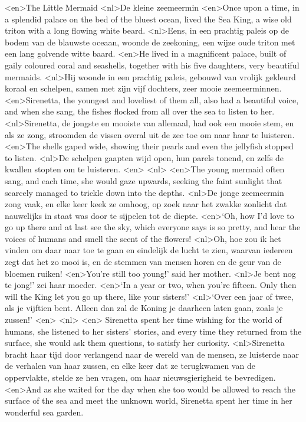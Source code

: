 <en>The Little Mermaid
<nl>De kleine zeemeermin
<en>Once upon a time, in a splendid palace on the bed of the bluest ocean, lived the Sea King, a wise old triton with a long flowing white beard.
<nl>Eens, in een prachtig paleis op de bodem van de blauwste oceaan, woonde de zeekoning, een wijze oude triton met een lang golvende witte baard.
<en>He lived in a magnificent palace, built of gaily coloured coral and seashells, together with his five daughters, very beautiful mermaids.
<nl>Hij woonde in een prachtig paleis, gebouwd van vrolijk gekleurd koraal en schelpen, samen met zijn vijf dochters, zeer mooie zeemeerminnen.
<en>Sirenetta, the youngest and loveliest of them all, also had a beautiful voice, and when she sang, the fishes flocked from all over the sea to listen to her.
<nl>Sirenetta, de jongste en mooiste van allemaal, had ook een mooie stem, en als ze zong, stroomden de vissen overal uit de zee toe om naar haar te luisteren.
<en>The shells gaped wide, showing their pearls and even the jellyfish stopped to listen.
<nl>De schelpen gaapten  wijd open,  hun parels  tonend, en zelfs de kwallen stopten om te luisteren.
<en>
<nl>
<en>The young mermaid often sang, and each time, she would gaze upwards, seeking the faint sunlight that scarcely managed to trickle down into the depths.
<nl>De jonge zeemeermin zong vaak, en elke keer keek ze omhoog, op zoek naar het zwakke zonlicht dat nauwelijks in staat was door te sijpelen tot de diepte.
<en>`Oh, how I’d love to go up there and at last see the sky, which everyone says is so pretty, and hear the voices of humans and smell the scent of the flowers!
<nl>Oh, hoe zou ik het vinden om daar naar toe te gaan en eindelijk de lucht te zien, waarvan iedereen zegt dat het zo mooi is, en de stemmen van mensen horen en de geur van de bloemen ruiken!
<en>You’re still too young!' said her mother.
<nl>Je bent nog te jong!' zei haar moeder.
<en>`In a year or two, when you’re fifteen. Only then will the King let you go up there, like your sisters!'
<nl>`Over een jaar of twee, als je vijftien bent. Alleen dan zal de Koning je daarheen laten gaan, zoals je zussen!'
<en>
<nl>
<en> Sirenetta spent her time wishing for the world of humans, she listened to her sisters’ stories, and every time they returned from the surface, she would ask them questions, to satisfy her curiosity.
<nl>Sirenetta bracht haar tijd door verlangend naar de wereld van de mensen, ze luisterde naar de verhalen van haar zussen, en elke keer dat ze terugkwamen van de oppervlakte, stelde ze hen vragen, om haar nieuwsgierigheid te bevredigen.
<en>And as she waited for the day when she too would be allowed to reach the surface of the sea and meet the unknown world, Sirenetta spent her time in her wonderful sea garden.
